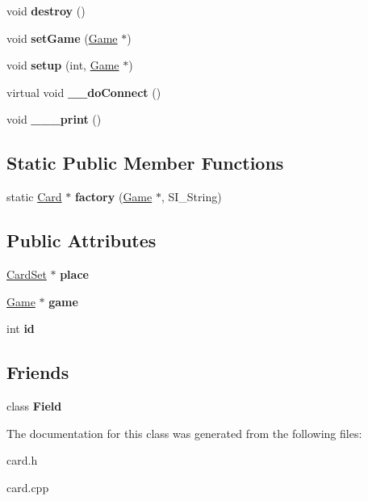 \begin{DoxyCompactItemize}
void {\bfseries destroy} ()
\item 
\mbox{\label{class_card_ad89cc3cf4c2afb10381655bf5940dec6}} 
void {\bfseries set\+Game} (\hyperlink{class_game}{Game} $\ast$)
\item 
\mbox{\label{class_card_afda7a2a346514b795d979494c68f5e15}} 
void {\bfseries setup} (int, \hyperlink{class_game}{Game} $\ast$)
\item 
\mbox{\label{class_card_aaf4b38dccc9e9d2cec7db8e1a8fa2efc}} 
virtual void {\bfseries \+\_\+\+\_\+do\+Connect} ()
\item 
\mbox{\label{class_card_a8a9fdf9ebc85896727159f11886b0bea}} 
void {\bfseries \+\_\+\+\_\+\+\_\+print} ()
\end{DoxyCompactItemize}
\subsection*{Static Public Member Functions}
\begin{DoxyCompactItemize}
\item 
\mbox{\label{class_card_abce1758283c642a8465655e855acc763}} 
static \hyperlink{class_card}{Card} $\ast$ {\bfseries factory} (\hyperlink{class_game}{Game} $\ast$, S\+I\+\_\+\+String)
\end{DoxyCompactItemize}
\subsection*{Public Attributes}
\begin{DoxyCompactItemize}
\item 
\mbox{\label{class_card_aae5c395ef6504102afea9bbf68a7bf73}} 
\hyperlink{class_card_set}{Card\+Set} $\ast$ {\bfseries place}
\item 
\mbox{\label{class_card_a525e165be1a96a9c76b6b3959d8f67f6}} 
\hyperlink{class_game}{Game} $\ast$ {\bfseries game}
\item 
\mbox{\label{class_card_ae6fb6f495bba4d639696f934b495c15f}} 
int {\bfseries id}
\end{DoxyCompactItemize}
\subsection*{Friends}
\begin{DoxyCompactItemize}
\item 
\mbox{\label{class_card_aaec47a26a3c11c1debd3ed922b69cbd2}} 
class {\bfseries Field}
\end{DoxyCompactItemize}


The documentation for this class was generated from the following files\+:\begin{DoxyCompactItemize}
\item 
card.\+h\item 
card.\+cpp\end{DoxyCompactItemize}
